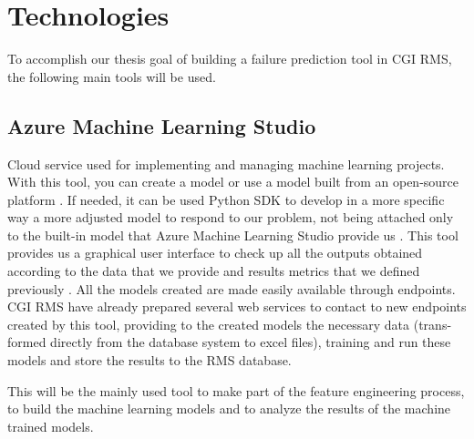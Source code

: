 


\chapter{Technologies}
\label{cha:introduction}

To accomplish our thesis goal of building a failure prediction tool in CGI RMS, the following main tools will be used.


\section{Azure Machine Learning Studio} 
\label{sub:if_you_use_this_template}

Cloud service used for implementing and managing machine learning projects. With this tool, you can create a model or use a model built from an open-source platform \cite{AZURE_MACHINE_LEARNING}.
If needed, it can be used Python SDK to develop in a more specific way a more adjusted model to respond to our problem, not being attached only to the built-in model that Azure Machine Learning Studio provide us \cite{AZURE_MACHINE_LEARNING}.
This tool provides us a graphical user interface to check up all the outputs obtained according to the data that we provide and results metrics that we defined previously \cite{AZURE_MACHINE_LEARNING}.
All the models created are made easily available through endpoints. CGI RMS have already prepared several web services to contact to new endpoints created by this tool, providing to the created models the necessary data (trans-formed directly from the database system to excel files), training and run these models and store the results to the RMS database.

This will be the mainly used tool to make part of the feature engineering process, to build the machine learning models and to analyze the results of the machine trained models.



